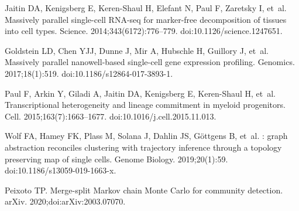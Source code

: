 \documentclass[10pt,letterpaper]{article}
\begin{document}
\begin{thebibliography}{10}
Jaitin DA, Kenigsberg E, Keren-Shaul H, Elefant N, Paul F, Zaretsky I, et~al.
\newblock Massively parallel single-cell {RNA}-seq for marker-free
  decomposition of tissues into cell types.
\newblock Science. 2014;343(6172):776--779.
\newblock doi:{10.1126/science.1247651}.

Goldstein LD, Chen YJJ, Dunne J, Mir A, Hubschle H, Guillory J, et~al.
\newblock Massively parallel nanowell-based single-cell gene expression
  profiling.
 Genomics. 2017;18(1):519.
\newblock doi:{10.1186/s12864-017-3893-1}.

Paul F, Arkin Y, Giladi A, Jaitin DA, Kenigsberg E, Keren-Shaul H, et~al.
\newblock Transcriptional heterogeneity and lineage commitment in myeloid
  progenitors.
\newblock Cell. 2015;163(7):1663--1677.
\newblock doi:{10.1016/j.cell.2015.11.013}.

Wolf FA, Hamey FK, Plass M, Solana J, Dahlin JS, {Göttgens} B, et~al.
: graph abstraction reconciles clustering with trajectory
  inference through a topology preserving map of single cells.
\newblock Genome Biology. 2019;20(1):59.
\newblock doi:{10.1186/s13059-019-1663-x}.

Peixoto TP.
\newblock Merge-split Markov chain Monte Carlo for community detection.
\newblock arXiv. 2020;doi:{arXiv:2003.07070}.

\end{thebibliography}
\end{document}
